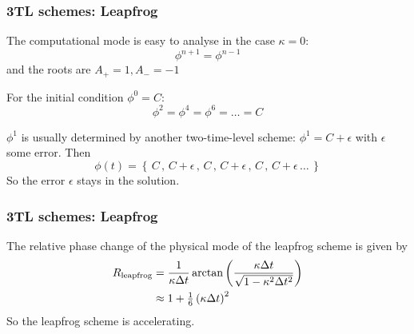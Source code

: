 \documentclass[aspectratio=43,9pt]{beamer}
\begin{document}
%
%
%
\begin{frame}
	\frametitle{3TL schemes: Leapfrog}
	The computational mode is easy to analyse in the case $\kappa = 0$:
	\begin{equation*}
		\phi^{n+1} = \phi^{n-1}
	\end{equation*}
	and the roots are $A_+ = 1, A_- = -1$
	\par
	For the initial condition $\phi^0 = C$:
	\begin{equation*}
		\phi^2 = \phi^4 = \phi^6 = \dots = C
	\end{equation*}
	\par
	$\phi^1$ is usually determined by another two-time-level scheme: $\phi^1 = C + \epsilon$ with $\epsilon$ some error. Then
	\begin{equation*}
		\phi(t) = \left\{\,C\,,\,C+\epsilon\,,\,C\,,\,C+\epsilon\,,\,C\,,\,C+\epsilon\,\ldots\,\right\}
	\end{equation*}
	So the error $\epsilon$ stays in the solution.
\end{frame}
%
%
%
\begin{frame}
	\frametitle{3TL schemes: Leapfrog}
	The relative phase change of the physical mode of the leapfrog scheme is given by
	\begin{align*}
		R_{\text{leapfrog}} &= \frac{1}{\kappa \Delta t} \arctan \left( \frac{\kappa \Delta t}{\sqrt{ 1 - \kappa^2 \Delta t^2 }} \right) \\
		&\approx 1 + {\textstyle\frac{1}{6}} \left( \kappa \Delta t \right)^2
	\end{align*}
	So the leapfrog scheme is accelerating.
\end{frame}
%
%
\end{document}
